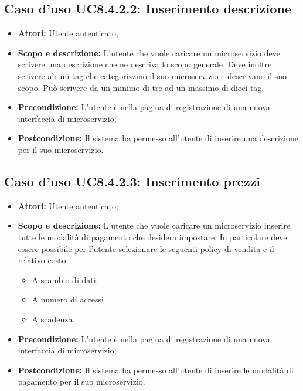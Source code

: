 \documentclass[12pt,a4paper,titlepage]{article}
\begin{document}
	\subsection{Caso d'uso UC8.4.2.2: Inserimento descrizione}
	\label{UC8.4.2.2}
	\begin{itemize}
		\item \textbf{Attori: }Utente autenticato;
		\item \textbf{Scopo e descrizione: }L'utente che vuole caricare un microservizio deve scrivere una descrizione che ne descriva lo scopo generale. Deve inoltre scrivere alcuni tag che categorizzino il suo microservizio e descrivano il suo scopo. Può scrivere da un minimo di tre ad un massimo di dieci tag.
		\item \textbf{Precondizione: }L'utente è nella pagina di registrazione di una nuova interfaccia di microservizio;
		\item \textbf{Postcondizione: }Il sistema ha permesso all'utente di inserire una descrizione per il suo microservizio.
	\end{itemize}
	\subsection{Caso d'uso UC8.4.2.3: Inserimento prezzi}
	\label{UC8.4.2.3}
	\begin{itemize}
		\item \textbf{Attori: }Utente autenticato;
		\item \textbf{Scopo e descrizione: }L'utente che vuole caricare un microservizio inserire tutte le modalità di pagamento che desidera impostare. In particolare deve essere possibile per l'utente selezionare le seguenti policy di vendita e il relativo costo:
		\begin{itemize}
			\item A scambio di dati;
			\item A numero di accessi
			\item A scadenza.
		\end{itemize} 
		\item \textbf{Precondizione: }L'utente è nella pagina di registrazione di una nuova interfaccia di microservizio;
		\item \textbf{Postcondizione: }Il sistema ha permesso all'utente di inserire le modalità di pagamento per il suo microservizio.
	\end{itemize}
\end{document}
